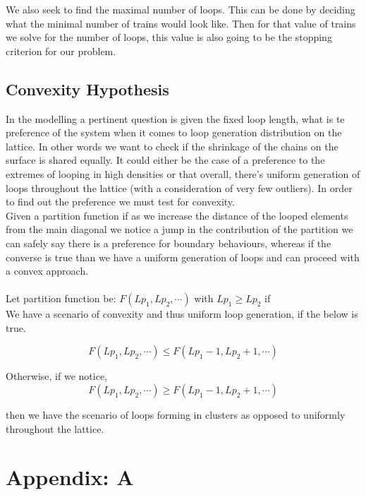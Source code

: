 \documentclass[10pt,letterpaper]{article}
\begin{document}
We also seek to find the maximal number of loops. This can be done by deciding what the minimal number of trains would look like. Then for that value of trains we solve for the number of loops, this value is also going to be the stopping criterion for our problem.



\subsection{Convexity Hypothesis}
In the modelling a pertinent question is given the fixed loop length, what is te preference of the system when it comes to loop generation distribution on the lattice. In other words we want to check if the shrinkage of the chains on the surface is shared equally. It could either be the case of a preference to the extremes of looping in high densities or that overall, there's uniform generation of loops throughout the lattice (with a consideration of very few outliers). In order to find out the preference we must test for convexity.\\

\noindent Given a partition function if as we increase the distance of the looped elements from the main diagonal we notice a jump in the contribution of the partition we can safely say there is a preference for boundary behaviours, whereas if the converse is true than we have a uniform generation of loops and can proceed with a convex approach.\\\\

\noindent Let partition function be: $F(Lp_1,Lp_2, \cdots)$ with $Lp_1\geq Lp_2$ if\\

\noindent We have a scenario of convexity and thus uniform loop generation, if the below is true.

$$F(Lp_1,Lp_2, \cdots)\leq F(Lp_1-1,Lp_2+1, \cdots)$$

\noindent Otherwise, if we notice,
$$F(Lp_1,Lp_2, \cdots)\geq F(Lp_1-1,Lp_2+1, \cdots)$$ 

\noindent then we have the scenario of loops forming in clusters as opposed to uniformly throughout the lattice.



 






\newpage
\section{Appendix: A}
\end{document}
